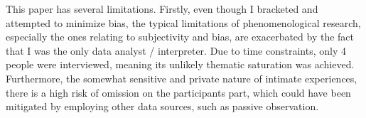 
This paper has several limitations.
Firstly, even though I bracketed and attempted to minimize bias, the typical limitations of phenomenological research, especially the ones relating to subjectivity and bias, are exacerbated by the fact that I was the only data analyst / interpreter.
Due to time constraints, only 4 people were interviewed, meaning its unlikely thematic saturation was achieved.
Furthermore, the somewhat sensitive and private nature of intimate experiences, there is a high risk of omission on the participants part, which could have been mitigated by employing other data sources, such as passive observation.